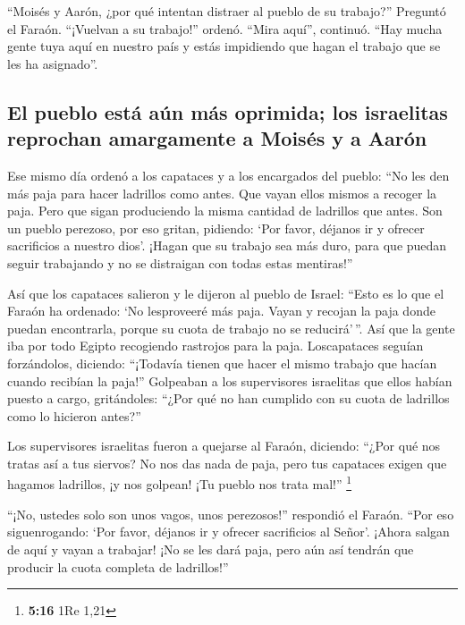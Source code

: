  ``Moisés y Aarón, ¿por qué intentan distraer al pueblo de
su trabajo?'' Preguntó el Faraón. ``¡Vuelvan a su trabajo!'' ordenó.
 ``Mira aquí'', continuó. ``Hay mucha gente tuya aquí en
nuestro país y estás impidiendo que hagan el trabajo que se les ha
asignado''.

\hypertarget{el-pueblo-estuxe1-auxfan-muxe1s-oprimida-los-israelitas-reprochan-amargamente-a-moisuxe9s-y-a-aaruxf3n}{%
\subsection{El pueblo está aún más oprimida; los israelitas reprochan
amargamente a Moisés y a
Aarón}\label{el-pueblo-estuxe1-auxfan-muxe1s-oprimida-los-israelitas-reprochan-amargamente-a-moisuxe9s-y-a-aaruxf3n}}

 Ese mismo día ordenó a los capataces y a los encargados
del pueblo:  ``No les den más paja para hacer ladrillos
como antes. Que vayan ellos mismos a recoger la paja. 
Pero que sigan produciendo la misma cantidad de ladrillos que antes. Son
un pueblo perezoso, por eso gritan, pidiendo: `Por favor, déjanos ir y
ofrecer sacrificios a nuestro dios'.  ¡Hagan que su
trabajo sea más duro, para que puedan seguir trabajando y no se
distraigan con todas estas mentiras!''

 Así que los capataces salieron y le dijeron al pueblo de
Israel: ``Esto es lo que el Faraón ha ordenado: `No lesproveeré más
paja.  Vayan y recojan la paja donde puedan encontrarla,
porque su cuota de trabajo no se reducirá'\,''.  Así que
la gente iba por todo Egipto recogiendo rastrojos para la paja.
 Loscapataces seguían forzándolos, diciendo: ``¡Todavía
tienen que hacer el mismo trabajo que hacían cuando recibían la paja!''
 Golpeaban a los supervisores israelitas que ellos habían
puesto a cargo, gritándoles: ``¿Por qué no han cumplido con su cuota de
ladrillos como lo hicieron antes?''

 Los supervisores israelitas fueron a quejarse al Faraón,
diciendo: ``¿Por qué nos tratas así a tus siervos?  No
nos das nada de paja, pero tus capataces exigen que hagamos ladrillos,
¡y nos golpean! ¡Tu pueblo nos trata mal!'' \footnote{\textbf{5:16} 1Re
  1,21}

 ``¡No, ustedes solo son unos vagos, unos perezosos!''
respondió el Faraón. ``Por eso siguenrogando: `Por favor, déjanos ir y
ofrecer sacrificios al Señor'.  ¡Ahora salgan de aquí y
vayan a trabajar! ¡No se les dará paja, pero aún así tendrán que
producir la cuota completa de ladrillos!''

